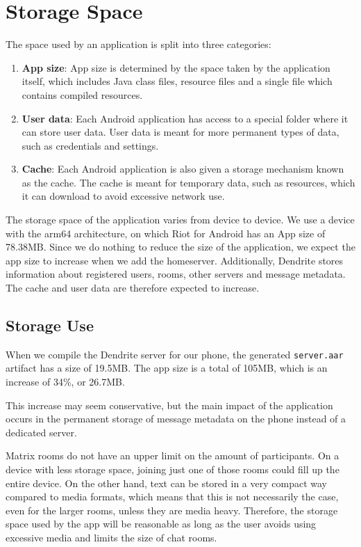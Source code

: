 \section{Storage Space}\label{sec:storage_space}
The space used by an application is split into three categories:
\begin{enumerate}
	\item{
	      \textbf{App size}:
	      App size is determined by the space taken by the application itself, which includes Java class files, resource files and a single file which contains compiled resources\cite{android_devdocs_apksize}.
	      }
	\item{
	      \textbf{User data}:
	      Each Android application has access to a special folder where it can store user data.
	      User data is meant for more permanent types of data, such as credentials and settings.
	      }
	\item{
	      \textbf{Cache}:
	      Each Android application is also given a storage mechanism known as the cache.
	      The cache is meant for temporary data, such as resources, which it can download to avoid excessive network use.
	      }
\end{enumerate}

The storage space of the application varies from device to device.
We use a device with the arm64 architecture, on which Riot for Android has an App size of 78.38MB\@.
Since we do nothing to reduce the size of the application, we expect the app size to increase when we add the homeserver.
Additionally, Dendrite stores information about registered users, rooms, other servers and message metadata.
The cache and user data are therefore expected to increase.

\subsection{Storage Use}\label{sec:storage_use}
When we compile the Dendrite server for our phone, the generated \texttt{server.aar} artifact has a size of 19.5MB\@.
The app size is a total of 105MB\@, which is an increase of 34\%, or 26.7MB\@.

This increase may seem conservative, but the main impact of the application occurs in the permanent storage of message metadata on the phone instead of a dedicated server.

Matrix rooms do not have an upper limit on the amount of participants. On a device with less storage space, joining just one of those rooms could fill up the entire device.
On the other hand, text can be stored in a very compact way compared to media formats, which means that this is not necessarily the case, even for the larger rooms, unless they are media heavy.
Therefore, the storage space used by the app will be reasonable as long as the user avoids using excessive media and limits the size of chat rooms.


